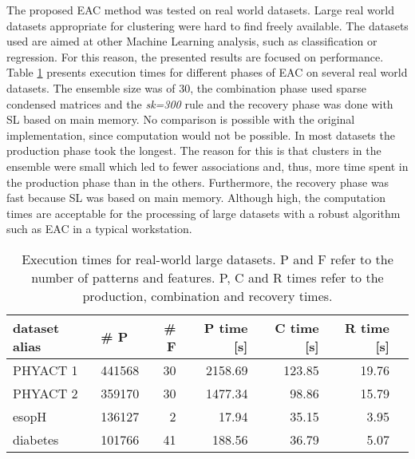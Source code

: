 The proposed EAC method was tested on real world datasets.
Large real world datasets appropriate for clustering were hard to find freely available.
The datasets used are aimed at other Machine Learning analysis, such as classification or regression.
For this reason, the presented results are focused on performance.
Table \ref{tab:eac big real} presents execution times for different phases of EAC on several real world datasets.
The ensemble size was of 30, the combination phase used sparse condensed matrices and the \emph{sk=300} rule and the recovery phase was done with SL based on main memory.
No comparison is possible with the original implementation, since computation would not be possible.
In most datasets the production phase took the longest.
The reason for this is that clusters in the ensemble were small which led to fewer associations and, thus, more time spent in the production phase than in the others.
Furthermore, the recovery phase was fast because SL was based on main memory.
Although high, the computation times are acceptable for the processing of large datasets with a robust algorithm such as EAC in a typical workstation.

\begin{table}[h]
\centering
\caption{Execution times for real-world large datasets. P and F refer to the number of patterns and features. P, C and R times refer to the production, combination and recovery times.}

\begin{tabular}{llrrrrr}
\toprule
dataset alias                                 &  \# P               &  \# F               &  P time [s]  &  C time [s] &  R time [s] \\
\midrule
PHYACT 1 \cite{Lichman:2013}                  &              441568 &                  30 &      2158.69 &      123.85 &      19.76 \\
PHYACT 2 \cite{Lichman:2013}                  &              359170 &                  30 &      1477.34 &       98.86 &      15.79 \\
esopH \cite{yuk13oro}                         &              136127 &                   2 &        17.94 &       35.15 &       3.95 \\
diabetes \cite{strack2014impact,Lichman:2013} &              101766 &                  41 &       188.56 &       36.79 &       5.07 \\
\bottomrule
\end{tabular}


\label{tab:eac big real}
\end{table}